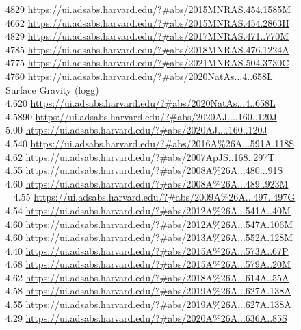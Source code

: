 4829 \url{https://ui.adsabs.harvard.edu/?#abs/2015MNRAS.454.1585M}\\
4662 \url{https://ui.adsabs.harvard.edu/?#abs/2015MNRAS.454.2863H}\\
4829 \url{https://ui.adsabs.harvard.edu/?#abs/2017MNRAS.471..770M}\\
4785 \url{https://ui.adsabs.harvard.edu/?#abs/2018MNRAS.476.1224A}\\
4775 \url{https://ui.adsabs.harvard.edu/?#abs/2021MNRAS.504.3730C}\\
4760 \url{https://ui.adsabs.harvard.edu/?#abs/2020NatAs...4..658L}\\
Surface Gravity (logg)\\
4.620 \url{https://ui.adsabs.harvard.edu/?#abs/2020NatAs...4..658L}\\
4.5890 \url{https://ui.adsabs.harvard.edu/?#abs/2020AJ....160..120J}\\
5.00 \url{https://ui.adsabs.harvard.edu/?#abs/2020AJ....160..120J}\\
4.540 \url{https://ui.adsabs.harvard.edu/?#abs/2016A%26A...591A.118S}\\
4.62 \url{https://ui.adsabs.harvard.edu/?#abs/2007ApJS..168..297T}\\
4.55 \url{https://ui.adsabs.harvard.edu/?#abs/2008A%26A...480...91S}\\
4.60 \url{https://ui.adsabs.harvard.edu/?#abs/2008A%26A...489..923M}\\\
4.55 \url{https://ui.adsabs.harvard.edu/?#abs/2009A%26A...497..497G}\\
4.54 \url{https://ui.adsabs.harvard.edu/?#abs/2012A%26A...541A..40M}\\
4.60 \url{https://ui.adsabs.harvard.edu/?#abs/2012A%26A...547A.106M}\\
4.60 \url{https://ui.adsabs.harvard.edu/?#abs/2013A%26A...552A.128M}\\
4.40 \url{https://ui.adsabs.harvard.edu/?#abs/2015A%26A...573A..67P}\\
4.68 \url{https://ui.adsabs.harvard.edu/?#abs/2015A%26A...579A..20M}\\
4.62 \url{https://ui.adsabs.harvard.edu/?#abs/2018A%26A...614A..55A}\\
4.58 \url{https://ui.adsabs.harvard.edu/?#abs/2019A%26A...627A.138A}\\
4.55 \url{https://ui.adsabs.harvard.edu/?#abs/2019A%26A...627A.138A}\\
4.29 \url{https://ui.adsabs.harvard.edu/?#abs/2020A%26A...636A..85S}\\
